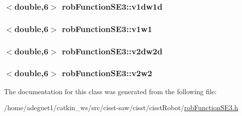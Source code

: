\hypertarget{classrob_function_s_e3_a0293adc3a9e5b8bd7f24dded9a70071a}{
\subsubsection[{v1dw1d}]{$<$double,6$>$ rob\-Function\-S\-E3\-::v1dw1d\hspace{0.3cm}{\ttfamily [protected]}}}\label{classrob_function_s_e3_a0293adc3a9e5b8bd7f24dded9a70071a}
\hypertarget{classrob_function_s_e3_a7b1d1ec3899e5c1f95c90fa2b3834e6e}{
\subsubsection[{v1w1}]{$<$double,6$>$ rob\-Function\-S\-E3\-::v1w1\hspace{0.3cm}{\ttfamily [protected]}}}\label{classrob_function_s_e3_a7b1d1ec3899e5c1f95c90fa2b3834e6e}
\hypertarget{classrob_function_s_e3_ab91a09514cf4b5f4b2626ed8e44133c0}{
\subsubsection[{v2dw2d}]{$<$double,6$>$ rob\-Function\-S\-E3\-::v2dw2d\hspace{0.3cm}{\ttfamily [protected]}}}\label{classrob_function_s_e3_ab91a09514cf4b5f4b2626ed8e44133c0}
\hypertarget{classrob_function_s_e3_a9e6845bf899f02dcab9dc56d59923787}{
\subsubsection[{v2w2}]{$<$double,6$>$ rob\-Function\-S\-E3\-::v2w2\hspace{0.3cm}{\ttfamily [protected]}}}\label{classrob_function_s_e3_a9e6845bf899f02dcab9dc56d59923787}


The documentation for this class was generated from the following file\-:\begin{DoxyCompactItemize}
\item 
/home/adeguet1/catkin\-\_\-ws/src/cisst-\/saw/cisst/cisst\-Robot/\hyperlink{rob_function_s_e3_8h}{rob\-Function\-S\-E3.\-h}\end{DoxyCompactItemize}

